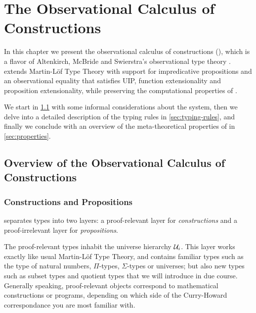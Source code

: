 \setchapterpreamble[u]{\margintoc}
\chapter{The Observational Calculus of Constructions}
\label{ch:observational}

In this chapter we present the observational calculus of constructions 
(\SetoidCC), which is a flavor of Altenkirch, McBride and Swierstra's 
observational type theory \cite{altenkirchAl:plpv2007}.
% 
\SetoidCC extends Martin-Löf Type Theory with support for impredicative 
propositions and an observational equality that satisfies UIP, function 
extensionality and proposition extensionality, while preserving
the computational properties of \MLTT. 

We start in \cref{sec:generalities} with some informal considerations about the system, 
then we delve into a detailed description of the typing rules in 
\cref{sec:typing-rules}, and finally we conclude 
with an overview of the meta-theoretical properties of
\SetoidCC in \cref{sec:properties}.

\section{Overview of the Observational Calculus of Constructions}
\label{sec:generalities}

\subsection{Constructions and Propositions}

\SetoidCC separates types into two layers: a proof-relevant layer for 
\emph{constructions} and a proof-irrelevant layer for \emph{propositions}. 

The proof-relevant types inhabit the universe hierarchy \( \mathcal{U}_i \).
% 
This layer works exactly like usual Martin-Löf Type Theory, and
contains familiar types
such as the type of natural numbers, \( \Pi \)-types, \( \Sigma \)-types or 
universes; but also new types such as subset types and quotient types that
we will introduce in due course.
% 
Generally speaking, proof-relevant objects correspond to mathematical 
constructions or programs, depending on which side of the Curry-Howard 
correspondance you are most familiar with.

